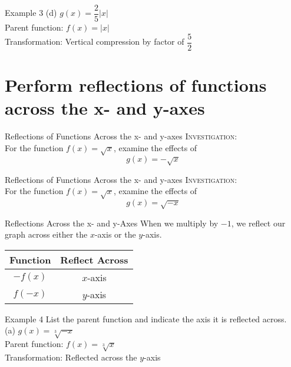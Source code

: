 \documentclass[t]{beamer}
\begin{document}
\begin{frame}{Example 3}
(d) \quad $g(x) = \dfrac{2}{5}|x|$	\newline\\	\pause
Parent function: $f(x) = |x|$ \newline\\	\pause
Transformation: Vertical compression by factor of $\dfrac{5}{2}$
\end{frame}

\section{Perform reflections of functions across the x- and y-axes}

\begin{frame}{Reflections of Functions Across the x- and y-axes}
\textsc{Investigation:}	\newline\\
For the function $f(x) = \sqrt{x}$, examine the effects of
\[g(x) = -\sqrt{x} \]
\end{frame}

\begin{frame}{Reflections of Functions Across the x- and y-axes}
\textsc{Investigation:}	\newline\\
For the function $f(x) = \sqrt{x}$, examine the effects of
\[g(x) =\sqrt{-x} \]
\end{frame}

\begin{frame}{Reflections Across the x- and y-Axes}
When we multiply by $-1$, we reflect our graph across either the $x$-axis or the $y$-axis.	\newline\\	\pause
\begin{center}
\setlength{\extrarowheight}{6pt}
\begin{tabular}{c|c}
\textbf{Function} & \textbf{Reflect Across} \\ \hline
$-f(x)$ & $x$-axis \\[6pt] \hline
$f(-x)$ & $y$-axis
\end{tabular}
\end{center}
\end{frame}

\begin{frame}{Example 4}
List the parent function and indicate the axis it is reflected across. \newline\\
(a) \quad $g(x) = \sqrt[3]{-x}$	\newline\\	\pause
Parent function: $f(x) = \sqrt[3]{x}$ \newline\\ \pause
Transformation: Reflected across the $y$-axis
\end{frame}
\end{document}
